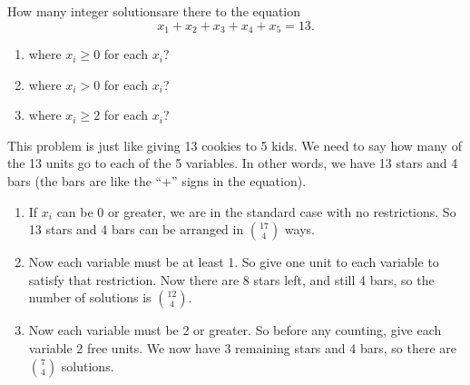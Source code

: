 \documentclass[12pt]{article}
\begin{document}
\begin{example}
  How many integer solutions\footnotemark are there to the equation
  \[x_1 + x_2 + x_3 + x_4 + x_5 = 13.\]
  \begin{enumerate}
    \item where $x_i \ge 0$ for each $x_i$?
    \item where $x_i > 0$ for each $x_i$?
    \item where $x_i \ge 2$ for each $x_i$?

  \end{enumerate}
  \begin{solution}
  This problem is just like giving 13 cookies to 5 kids.  We need to say how many of the 13 units go to each of the 5 variables.  In other words, we have 13 stars and 4 bars (the bars are like the ``+'' signs in the equation).
      \begin{enumerate}
    \item If $x_i$ can be 0 or greater, we are in the standard case with no restrictions.  So 13 stars and 4 bars can be arranged in ${17 \choose 4}$ ways.
    \item Now each variable must be at least 1.  So give one unit to each variable to satisfy that restriction.  Now there are 8 stars left, and still 4 bars, so the number of solutions is ${12 \choose 4}$.
    \item Now each variable must be 2 or greater.  So before any counting, give each variable 2 free units.  We now have 3 remaining stars and 4 bars, so there are ${7 \choose 4}$ solutions.
      
  \end{enumerate}
  \end{solution}

\end{example}
\end{document}
